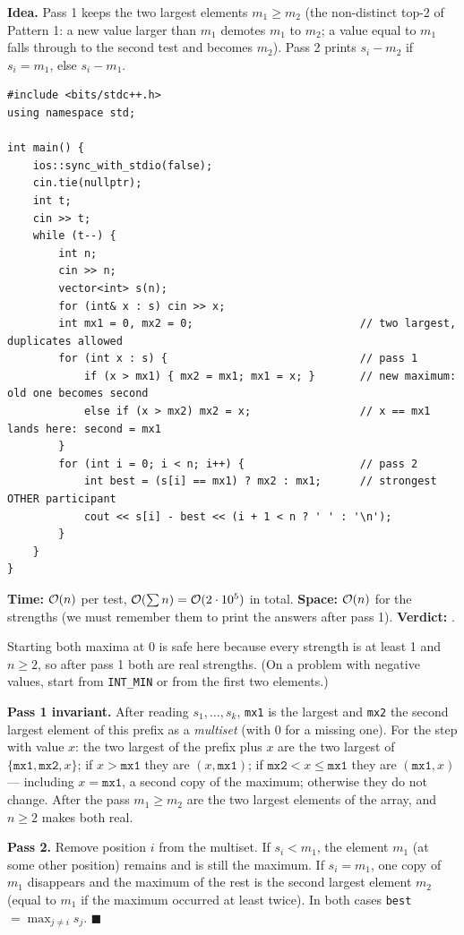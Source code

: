 \begin{algorithmbox}
\textbf{Idea.} Pass 1 keeps the two largest elements $m_1 \ge m_2$ (the non-distinct top-2 of Pattern 1: a new value larger than $m_1$ demotes $m_1$ to $m_2$; a value equal to $m_1$ falls through to the second test and becomes $m_2$). Pass 2 prints $s_i - m_2$ if $s_i = m_1$, else $s_i - m_1$.
\begin{lstlisting}[style=cpp]
#include <bits/stdc++.h>
using namespace std;

int main() {
    ios::sync_with_stdio(false);
    cin.tie(nullptr);
    int t;
    cin >> t;
    while (t--) {
        int n;
        cin >> n;
        vector<int> s(n);
        for (int& x : s) cin >> x;
        int mx1 = 0, mx2 = 0;                          // two largest, duplicates allowed
        for (int x : s) {                              // pass 1
            if (x > mx1) { mx2 = mx1; mx1 = x; }       // new maximum: old one becomes second
            else if (x > mx2) mx2 = x;                 // x == mx1 lands here: second = mx1
        }
        for (int i = 0; i < n; i++) {                  // pass 2
            int best = (s[i] == mx1) ? mx2 : mx1;      // strongest OTHER participant
            cout << s[i] - best << (i + 1 < n ? ' ' : '\n');
        }
    }
}
\end{lstlisting}
\begin{complexitybox}
\textbf{Time:} $\mathcal{O}(n)$ per test, $\mathcal{O}(\sum n) = \mathcal{O}(2\cdot10^5)$ in total. \textbf{Space:} $\mathcal{O}(n)$ for the strengths (we must remember them to print the answers after pass 1). \textbf{Verdict:} \ac{}.
\end{complexitybox}
\end{algorithmbox}

Starting both maxima at $0$ is safe here because every strength is at least 1 and $n \ge 2$, so after pass 1 both are real strengths. (On a problem with negative values, start from \texttt{INT\_MIN} or from the first two elements.)

\begin{invariantbox}
\textbf{Pass 1 invariant.} After reading $s_1, \dots, s_k$, \texttt{mx1} is the largest and \texttt{mx2} the second largest element of this prefix as a \emph{multiset} (with $0$ for a missing one). For the step with value $x$: the two largest of the prefix plus $x$ are the two largest of $\{\texttt{mx1}, \texttt{mx2}, x\}$; if $x > \texttt{mx1}$ they are $(x, \texttt{mx1})$; if $\texttt{mx2} < x \le \texttt{mx1}$ they are $(\texttt{mx1}, x)$ --- including $x = \texttt{mx1}$, a second copy of the maximum; otherwise they do not change. After the pass $m_1 \ge m_2$ are the two largest elements of the array, and $n \ge 2$ makes both real.

\textbf{Pass 2.} Remove position $i$ from the multiset. If $s_i < m_1$, the element $m_1$ (at some other position) remains and is still the maximum. If $s_i = m_1$, one copy of $m_1$ disappears and the maximum of the rest is the second largest element $m_2$ (equal to $m_1$ if the maximum occurred at least twice). In both cases \texttt{best} $= \max_{j \ne i} s_j$. \hfill$\blacksquare$
\end{invariantbox}

